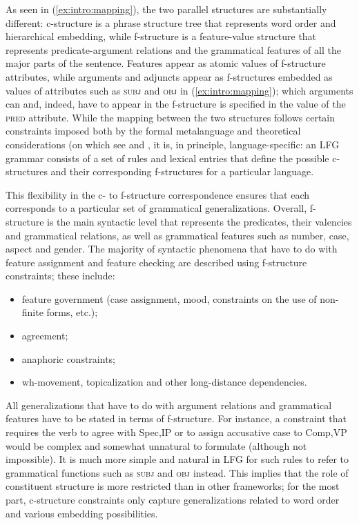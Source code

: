 \documentclass[output=paper]{langscibook}
\begin{document}
    As seen in (\ref{ex:intro:mapping}), the two parallel structures are substantially different: c-structure is a phrase structure tree that represents word order and hierarchical embedding, while f-structure is a feature-value structure that represents predicate-argument relations and the grammatical features of all the major parts of the sentence. Features appear as atomic values of f-structure attributes, while arguments and adjuncts appear as f-structures embedded as values of attributes such as \textsc{subj} and \textsc{obj} in (\ref{ex:intro:mapping}); which arguments can and, indeed, have to appear in the f-structure is specified in the value of the \textsc{pred} attribute. While the mapping between the two structures follows certain constraints imposed both by the formal metalanguage and theoretical considerations (on which see  and , it is, in principle, language-specific: an LFG grammar consists of a set of rules and lexical entries that define the possible c-structures and their corresponding f-structures for a particular language.

    This flexibility in the c- to f-structure correspondence ensures that each corresponds to a particular set of grammatical generalizations. Overall, f-structure is the main syntactic level that represents the predicates, their valencies and grammatical relations, as well as grammatical features such as number, case, aspect and gender. The majority of syntactic phenomena that have to do with feature assignment and feature checking are described using f-structure constraints; these include:

    \begin{itemize}
     \item feature government (case assignment, mood, constraints on the use of non-finite forms, etc.);
     \item agreement;
     \item anaphoric constraints;
     \item wh-movement, topicalization and other long-distance dependencies.
    \end{itemize}
All generalizations that have to do with argument relations and grammatical features have to be stated in terms of f-structure. For instance, a constraint that requires the verb to agree with Spec,IP or to assign accusative case to Comp,VP would be complex and somewhat unnatural to formulate (although not impossible). It is much more simple and natural in LFG for such rules to refer to grammatical functions such as \textsc{subj} and \textsc{obj} instead. This implies that the role of constituent structure is more restricted than in other frameworks; for the most part, c-structure constraints only capture generalizations related to word order and various embedding possibilities.
    
\end{document}
